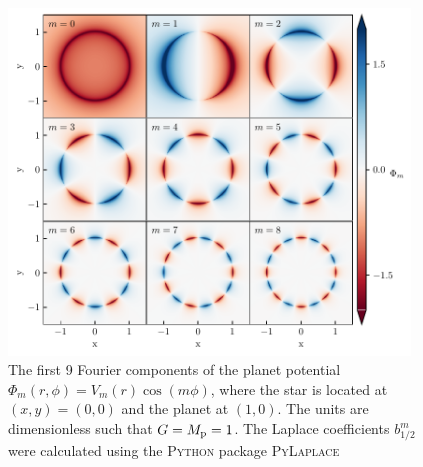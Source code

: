 \begin{figure}
    \centering
    \includegraphics[width = 0.95\textwidth]{figures/planet_components.pdf}
    \caption{The first 9 Fourier components of the planet potential $\Phi_m(r,\phi) = V_m(r) \cos (m \phi)$, where the star is located at $(x,y) = (0,0)$ and the planet at $(1,0)$. The units are dimensionless such that $G=M_{\rm p}=1$. The Laplace coefficients $b_{1/2}^m$ were calculated using the \textsc{Python} package \textsc{PyLaplace} \citep{paardekooper2019a}}
    \label{fig:planet_fourier}
\end{figure}


